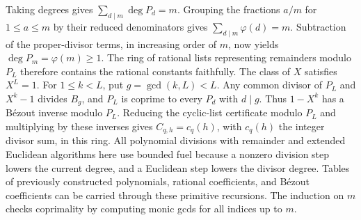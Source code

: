 Taking degrees gives $\sum_{d\mid m}\deg P_d=m$. Grouping the fractions
$a/m$ for $1\le a\le m$ by their reduced denominators gives
$\sum_{d\mid m}\varphi(d)=m$. Subtraction of the proper-divisor terms,
in increasing order of $m$, now yields $\deg P_m=\varphi(m)\ge1$.
The ring of rational lists representing remainders modulo $P_L$ therefore
contains the rational constants faithfully. The class of $X$ satisfies
$X^L=1$. For $1\le k<L$, put $g=\gcd(k,L)<L$. Any common divisor of
$P_L$ and $X^k-1$ divides $B_g$, and $P_L$ is coprime to every $P_d$
with $d\mid g$. Thus $1-X^k$ has a B\'ezout inverse modulo $P_L$. Reducing
the cyclic-list certificate modulo $P_L$ and multiplying by these inverses
gives $C_{q,h}=c_q(h)$, with $c_q(h)$ the integer divisor sum, in this
ring. All polynomial divisions with remainder and extended Euclidean
algorithms here use bounded fuel because a nonzero division step lowers the
current degree, and a Euclidean step lowers the divisor degree. Tables
of previously constructed polynomials, rational coefficients, and
B\'ezout coefficients can be carried through these primitive recursions.
The induction on $m$ checks coprimality by computing monic gcds for all
indices up to $m$.
